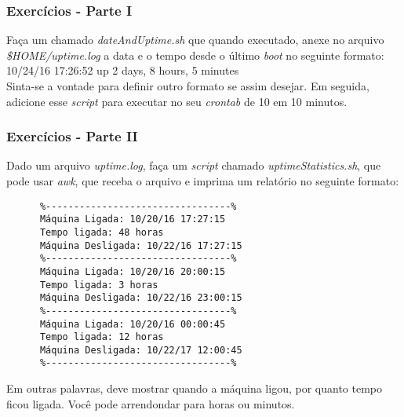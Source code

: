 \documentclass{beamer}
\begin{document}
   \begin{frame}
      \frametitle{Exercícios - Parte I}
      Faça um  chamado \textit{dateAndUptime.sh} que quando executado, anexe no arquivo \textit{\$HOME/uptime.log} a data e o tempo desde o último \textit{boot} no seguinte formato: \\
      10/24/16 17:26:52 up 2 days, 8 hours, 5 minutes \\
      Sinta-se a vontade para definir outro formato se assim desejar. Em seguida, adicione esse \textit{script} para executar no seu \textit{crontab} de 10 em 10 minutos.
   \end{frame}

   \begin{frame}[fragile]
      \frametitle{Exercícios - Parte II}
      Dado um arquivo \textit{uptime.log}, faça um \textit{script} chamado \textit{uptimeStatistics.sh}, que pode usar \textit{awk}, que receba o arquivo e imprima um relatório no seguinte formato: \\
      \scriptsize
      \begin{verbatim}
      %---------------------------------%
      Máquina Ligada: 10/20/16 17:27:15
      Tempo ligada: 48 horas
      Máquina Desligada: 10/22/16 17:27:15
      %---------------------------------%
      Máquina Ligada: 10/20/16 20:00:15
      Tempo ligada: 3 horas
      Máquina Desligada: 10/22/16 23:00:15
      %---------------------------------%
      Máquina Ligada: 10/20/16 00:00:45
      Tempo ligada: 12 horas
      Máquina Desligada: 10/22/17 12:00:45
      %---------------------------------%
      \end{verbatim}
      \normalsize
      Em outras palavras, deve mostrar quando a máquina ligou, por quanto tempo ficou ligada. Você pode arrendondar para horas ou minutos. \\
\end{frame}
\end{document}
